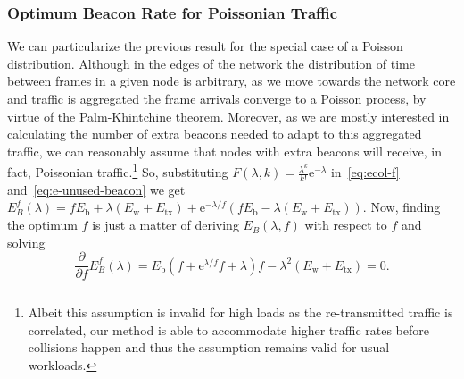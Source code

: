 \documentclass[journal,english,twocolumn,10pt,letterpaper]{IEEEtran}
\begin{document}
\subsubsection{Optimum Beacon Rate for Poissonian Traffic}
\label{sec:optimum-beacon-rate}

We can particularize the previous result for the special case of a Poisson
distribution. Although in the edges of the network the distribution of time
between frames in a given node is arbitrary, as we move towards the network
core and traffic is aggregated the frame arrivals converge to a Poisson
process, by virtue of the Palm-Khintchine theorem. Moreover, as we are mostly
interested in calculating the number of extra beacons needed to adapt to this
aggregated traffic, we can reasonably assume that nodes with extra beacons
will receive, in fact, Poissonian traffic.\footnote{Albeit this assumption is
  invalid for high loads as the re-transmitted traffic is correlated, our
  method is able to accommodate higher traffic rates before collisions happen
  and thus the assumption remains valid for usual workloads.} So, substituting
$F(\lambda, k) = \frac{\lambda^k}{k!} \mathrm{e}^{-\lambda}$
in~\eqref{eq:ecol-f} and~\eqref{eq:e-unused-beacon} we get
$E^f_B(\lambda) = f E_{\mathrm{b}} + \lambda (E_{\mathrm{w}} +
E_{\mathrm{tx}}) +\mathrm{e}^{-\lambda/f} (f E_{\mathrm{b}} -
\lambda(E_{\mathrm{w}} + E_{\mathrm{tx}})).$
Now, finding the optimum $f$ is just a matter of deriving $E_B(\lambda, f)$ with respect to
$f$ and solving
\begin{equation}
  \label{eq:exact-f}
  \frac{\partial}{\partial f}E_B^f(\lambda)=E_{\mathrm{b}} (f + \mathrm{e}^{\lambda/f} f + \lambda)f -
  \lambda^2(E_{\mathrm{w}} + E_{\mathrm{tx}}) = 0.
\end{equation}
\end{document}

